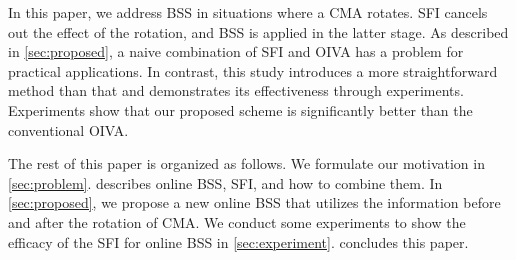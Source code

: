 \documentclass[sip,biber]{now-journal}
\begin{document}
In this paper, we address BSS in situations where a CMA rotates.
SFI cancels out the effect of the rotation, and BSS is applied in the latter stage.
As described in \cref{sec:proposed}, a naive combination of SFI and OIVA has a problem for practical applications.
In contrast, this study introduces a more straightforward method than that and demonstrates its effectiveness through experiments.
Experiments show that our proposed scheme is significantly better than the conventional OIVA.

The rest of this paper is organized as follows.
We formulate our motivation in \cref{sec:problem}.
 describes online BSS, SFI, and how to combine them.
In \cref{sec:proposed}, we propose a new online BSS that utilizes the information before and after the rotation of CMA.
We conduct some experiments to show the efficacy of the SFI for online BSS in \cref{sec:experiment}.
 concludes this paper.
\end{document}

